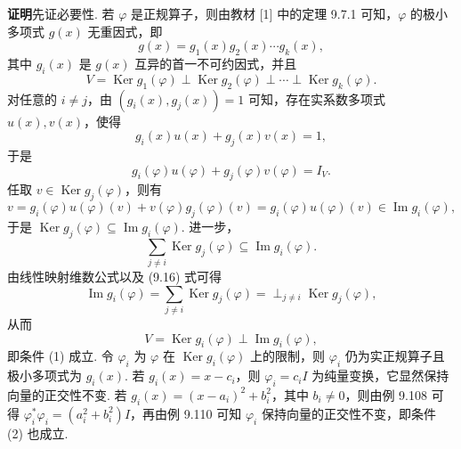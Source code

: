 \documentclass[UTF8, 12pt, fontset=fandol, oneside]{ctexart}
\begin{document}
\noindent\textbf{证明}\quad 先证必要性. 若 $\varphi$ 是正规算子，则由教材 [1] 中的定理 9.7.1 可知，$\varphi$ 的极小多项式 $g(x)$ 无重因式，即
\[
g(x)=g_1(x)g_2(x)\cdots g_k(x),
\]
其中 $g_i(x)$ 是 $g(x)$ 互异的首一不可约因式，并且
\begin{equation}
V=\operatorname{Ker} g_1(\varphi)\perp\operatorname{Ker} g_2(\varphi)\perp\cdots\perp\operatorname{Ker} g_k(\varphi).
\tag{9.16}
\end{equation}
对任意的 $i\ne j$，由 $(g_i(x),g_j(x))=1$ 可知，存在实系数多项式 $u(x),v(x)$，使得
\[
g_i(x)u(x)+g_j(x)v(x)=1,
\]
于是
\[
g_i(\varphi)u(\varphi)+g_j(\varphi)v(\varphi)=I_V.
\]
任取 $v\in\operatorname{Ker}g_j(\varphi)$，则有
\[
v=g_i(\varphi)u(\varphi)(v)+v(\varphi)g_j(\varphi)(v)=g_i(\varphi)u(\varphi)(v)\in\operatorname{Im}g_i(\varphi),
\]
于是 $\operatorname{Ker}g_j(\varphi)\subseteq\operatorname{Im}g_i(\varphi)$. 进一步，
\[
\sum_{j\ne i}\operatorname{Ker}g_j(\varphi)\subseteq\operatorname{Im}g_i(\varphi).
\]
由线性映射维数公式以及 (9.16) 式可得
\[
\operatorname{Im}g_i(\varphi)=\sum_{j\ne i}\operatorname{Ker}g_j(\varphi)=\perp_{j\ne i}\operatorname{Ker}g_j(\varphi),
\]
从而
\[
V=\operatorname{Ker}g_i(\varphi)\perp\operatorname{Im}g_i(\varphi),
\]
即条件 (1) 成立. 令 $\varphi_i$ 为 $\varphi$ 在 $\operatorname{Ker}g_i(\varphi)$ 上的限制，则 $\varphi_i$ 仍为实正规算子且极小多项式为 $g_i(x)$. 若 $g_i(x)=x-c_i$，则 $\varphi_i=c_iI$ 为纯量变换，它显然保持向量的正交性不变. 若 $g_i(x)=(x-a_i)^2+b_i^2$，其中 $b_i\ne0$，则由例 9.108 可得 $\varphi_i^*\varphi_i=(a_i^2+b_i^2)I$，再由例 9.110 可知 $\varphi_i$ 保持向量的正交性不变，即条件 (2) 也成立.
\end{document}
